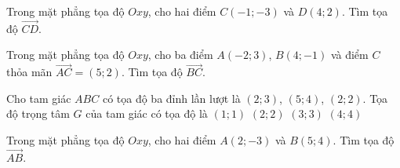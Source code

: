 \begin{bt}%
Trong mặt phẳng tọa độ $Oxy$, cho hai điểm $C(-1; -3)$ và $D(4; 2)$. Tìm tọa độ $\overrightarrow{CD}$.
\end{bt}

\begin{bt}%
Trong mặt phẳng tọa độ $Oxy$, cho ba điểm $A(-2; 3)$, $B(4; -1)$ và điểm $C$ thỏa mãn $\overrightarrow{AC}=(5; 2)$. Tìm tọa độ $\overrightarrow{BC}$.
\end{bt}


\begin{ex}%
	Cho tam  giác $ABC$ có tọa độ ba đỉnh lần lượt là $(2;3)$, $(5;4)$, $(2;2)$. Tọa độ trọng tâm $G$ của tam giác có tọa độ là
	\choice 
		 {$(1;1)$}
		{$(2;2)$} 
		{\True  $(3;3)$}
		 {$(4;4)$}
\end{ex}

\begin{bt}%
Trong mặt phẳng tọa độ $Oxy$, cho hai điểm $A(2; -3)$ và $B(5; 4)$. Tìm tọa độ $\overrightarrow{AB}$.
\end{bt}

